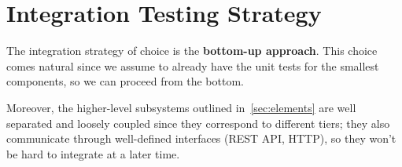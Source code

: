 \section{Integration Testing Strategy}
\label{sec:integration-testing-strategy}

The integration strategy of choice is the \textbf{bottom-up approach}.
This choice comes natural since we assume to already have the unit tests for the smallest components, so we can proceed from the bottom.

Moreover, the higher-level subsystems outlined in~\autoref{sec:elements} are well separated and loosely coupled since they correspond to different tiers;
they also communicate through well-defined interfaces (REST API, HTTP), so they won't be hard to integrate at a later time.
